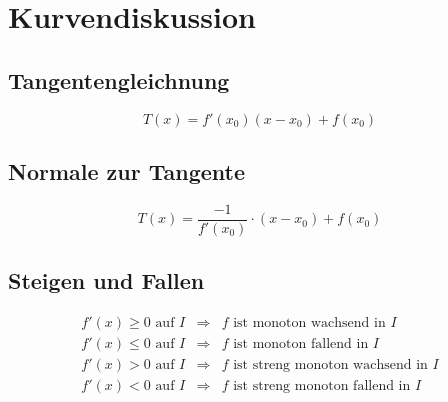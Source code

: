 



\section{Kurvendiskussion}

\subsection{Tangentengleichnung}
\label{subsec:tangentengleichung}
\[ \boxed{T(x) = f'(x_0)(x - x_0) + f(x_0)} \]

\subsection{Normale zur Tangente}
\[ \boxed{ T(x) = \frac{-1}{f'(x_0)} \cdot (x-x_0) + f(x_0) } \]

\subsection{Steigen und Fallen}
\label{subsec:monotonie}
\[ \boxed{ \begin{array}{lll}
f'(x) \geq 0 \text{ auf } I & \Rightarrow  
& f \text{ ist monoton wachsend in $I$} \\
f'(x) \leq 0 \text{ auf } I & \Rightarrow  
& f \text{ ist monoton fallend in $I$} \\
f'(x) > 0 \text{ auf } I & \Rightarrow  
& f \text{ ist streng monoton wachsend in $I$} \\
f'(x) < 0 \text{ auf } I & \Rightarrow  
& f \text{ ist streng monoton fallend in $I$}
\end{array} } \]

